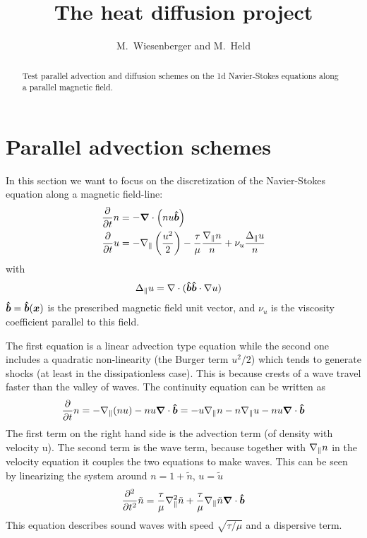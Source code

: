 


\newcommand{\PP}{H^+}
\newcommand{\QQ}{H^-}



\title{The heat diffusion project}
\author{ M.~Wiesenberger and M.~Held}
\maketitle

\begin{abstract}
    Test parallel advection and diffusion schemes on the 1d Navier-Stokes equations
    along a parallel magnetic field.
\end{abstract}
\tableofcontents

\section{Parallel advection schemes}
In this section we want to focus on the discretization of the Navier-Stokes equation
along a magnetic field-line:
\begin{align}
    \frac{\partial}{\partial t} n &= - {\boldsymbol{\nabla}}\cdot\left( nu\bm{\hat{b}}\right) \\
    \frac{\partial}{\partial t} u &= - \nabla_\parallel\left(\frac{u^2}{2}\right) - \frac{\tau}{\mu} \frac{\nabla_\parallel n}{n} + \nu_u \frac{\Delta_\parallel u}{n}
\end{align}
with
\begin{align}
\Delta_\parallel u &= \nabla\cdot ( \bm{\hat{b}}\bm{\hat{b}}\cdot\nabla u)
\end{align}
$\bm{\hat{b}} = \bm{\hat{b}}({\boldsymbol{x}})$ is the prescribed magnetic field unit vector,
and $\nu_u$ is the viscosity coefficient parallel to this field.

The first equation is a linear advection type equation while the second one includes
a quadratic non-linearity (the Burger term $u^2/2$) which tends to generate
shocks (at least in the dissipationless case). This is because crests of a wave
travel faster than the valley of waves.
The continuity equation can be written as
\begin{align}
    \frac{\partial}{\partial t} n = - \nabla_\parallel (nu) - nu {\boldsymbol{\nabla}}\cdot\bm{\hat{b}} = -u\nabla_\parallel n - n \nabla_\parallel u - nu{\boldsymbol{\nabla}}\cdot \bm{\hat{b}}
\end{align}
The first term on the right hand side is the advection term (of density with velocity u). The second term is the wave term, because together with $\nabla_\parallel n$ in the velocity
equation it couples the two equations to make waves. This can be seen by linearizing
the system around $n= 1 + \tilde n$, $u = \tilde u$
\begin{align}
    \frac{\partial^2}{\partial t^2} \tilde n = \frac{\tau}{\mu} \nabla_\parallel^2 \tilde n + \frac{\tau}{\mu} \nabla_\parallel \tilde n {\boldsymbol{\nabla}}\cdot\bm{\hat{b}}
\end{align}
This equation describes sound waves with speed $\sqrt{\tau/\mu}$ and a
dispersive term.


